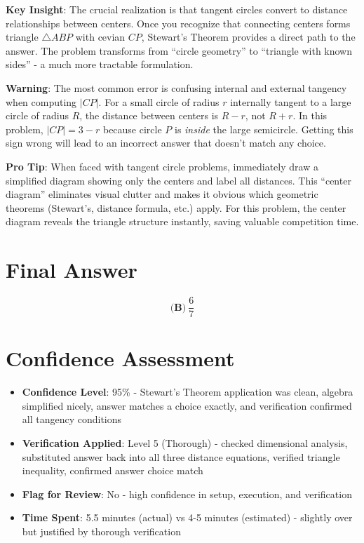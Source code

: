 \documentclass[]{article}
\begin{document}
\begin{keyinsightbox}
\textbf{Key Insight}: The crucial realization is that tangent circles convert to distance relationships between centers. Once you recognize that connecting centers forms triangle $\triangle ABP$ with cevian $CP$, Stewart's Theorem provides a direct path to the answer. The problem transforms from ``circle geometry'' to ``triangle with known sides'' - a much more tractable formulation.
\end{keyinsightbox}

\begin{warningbox}
\textbf{Warning}: The most common error is confusing internal and external tangency when computing $|CP|$. For a small circle of radius $r$ internally tangent to a large circle of radius $R$, the distance between centers is $R - r$, not $R + r$. In this problem, $|CP| = 3 - r$ because circle $P$ is \emph{inside} the large semicircle. Getting this sign wrong will lead to an incorrect answer that doesn't match any choice.
\end{warningbox}

\begin{tipbox}
\textbf{Pro Tip}: When faced with tangent circle problems, immediately draw a simplified diagram showing only the centers and label all distances. This ``center diagram'' eliminates visual clutter and makes it obvious which geometric theorems (Stewart's, distance formula, etc.) apply. For this problem, the center diagram reveals the triangle structure instantly, saving valuable competition time.
\end{tipbox}

\section*{Final Answer}
\[\boxed{\textbf{(B)}\ \frac{6}{7}}\]

\section*{Confidence Assessment}
\begin{itemize}[leftmargin=*]
    \item \textbf{Confidence Level}: 95\% - Stewart's Theorem application was clean, algebra simplified nicely, answer matches a choice exactly, and verification confirmed all tangency conditions
    \item \textbf{Verification Applied}: Level 5 (Thorough) - checked dimensional analysis, substituted answer back into all three distance equations, verified triangle inequality, confirmed answer choice match
    \item \textbf{Flag for Review}: No - high confidence in setup, execution, and verification
    \item \textbf{Time Spent}: 5.5 minutes (actual) vs 4-5 minutes (estimated) - slightly over but justified by thorough verification
\end{itemize}
\end{document}
